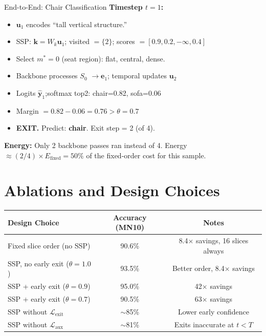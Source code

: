 \documentclass[11pt,a4paper]{article}
\begin{document}
\begin{examplebox}{End-to-End: Chair Classification}
\bigskip\noindent
\textbf{Timestep $t=1$:}
\begin{itemize}
  \item $\mathbf{u}_1$ encodes ``tall vertical structure.''
  \item SSP: $\mathbf{k} = W_k \mathbf{u}_1$;\quad
    visited $= \{2\}$;\quad
    scores $= [0.9, 0.2, -\infty, 0.4]$
  \item Select $m^*=0$ (seat region): flat, central, dense.
  \item Backbone processes $S_0$ $\to \mathbf{e}_1$;\quad
    temporal updates $\mathbf{u}_2$
  \item Logits $\hat{\mathbf{y}}_1$;\quad softmax top2: chair=0.82, sofa=0.06
  \item Margin $= 0.82 - 0.06 = 0.76 > \theta = 0.7$
  \item \textbf{EXIT.} Predict: \textbf{chair}. Exit step = 2 (of 4).
\end{itemize}

\bigskip\noindent
\textbf{Energy:} Only 2 backbone passes ran instead of 4.
Energy $\approx (2/4) \times E_\text{fixed} = 50\%$ of the fixed-order cost
for this sample.
\end{examplebox}

\section{Ablations and Design Choices}

\begin{center}
\begin{tabular}{lcc}
\toprule
Design Choice & Accuracy (MN10) & Notes \\
\midrule
Fixed slice order (no SSP) & 90.6\% & 8.4$\times$ savings, 16 slices always \\
SSP, no early exit ($\theta=1.0$) & 93.5\% & Better order, 8.4$\times$ savings \\
SSP + early exit ($\theta=0.9$) & 95.0\% & 42$\times$ savings \\
SSP + early exit ($\theta=0.7$) & 90.5\% & 63$\times$ savings \\
SSP without $\mathcal{L}_\text{exit}$ & $\sim$85\% & Lower early confidence \\
SSP without $\mathcal{L}_\text{aux}$ & $\sim$81\% & Exits inaccurate at $t<T$ \\
\bottomrule
\end{tabular}
\end{center}
\end{document}
